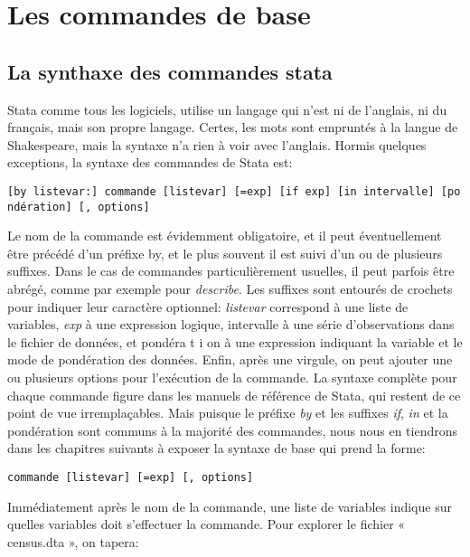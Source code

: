 \documentclass[
]{book}
\begin{document}
\hypertarget{les-commandes-de-base}{%
\section{Les commandes de base}\label{les-commandes-de-base}}

\hypertarget{la-synthaxe-des-commandes-stata}{%
\subsection{La synthaxe des commandes stata}\label{la-synthaxe-des-commandes-stata}}

Stata comme tous les logiciels, utilise un langage qui n'est ni de
l'anglais, ni du français, mais son propre langage. Certes, les
mots sont empruntés à la langue de Shakespeare, mais la syntaxe
n'a rien à voir avec l'anglais. Hormis quelques exceptions, la
syntaxe des commandes de Stata est:

\texttt{{[}by\ listevar:{]}\ commande\ {[}listevar{]}\ {[}=exp{]}\ {[}if\ exp{]}\ {[}in\ intervalle{]}\ {[}pondération{]}\ {[},\ options{]}}

Le nom de la commande est évidemment obligatoire, et il peut
éventuellement être précédé d'un préfixe by, et le plus souvent il
est suivi d'un ou de plusieurs suffixes. Dans le cas de
commandes particulièrement usuelles, il peut parfois être abrégé,
comme par exemple pour \emph{describe}. Les suffixes sont entourés de crochets pour indiquer leur caractère optionnel:
\emph{listevar} correspond à une liste de variables, \emph{exp} à une
expression logique, intervalle à une série d'observations
dans le fichier de données, et pondéra t i on à une expression
indiquant la variable et le mode de pondération des données.
Enfin, après une virgule, on peut ajouter une ou plusieurs
options pour l'exécution de la commande.
La syntaxe complète pour chaque commande figure dans les
manuels de référence de Stata, qui restent de ce point de vue
irremplaçables. Mais puisque le préfixe \emph{by} et les suffixes \emph{if}, \emph{in}
et la pondération sont communs à la majorité des commandes,
nous nous en tiendrons dans les chapitres suivants à exposer la
syntaxe de base qui prend la forme:

\texttt{commande\ {[}listevar{]}\ {[}=exp{]}\ {[},\ options{]}}

Immédiatement après le nom de la commande, une liste de
variables indique sur quelles variables doit s'effectuer la commande. Pour explorer le fichier « census.dta », on tapera:
\end{document}
